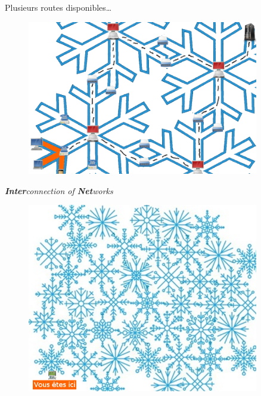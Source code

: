 \begin{frame}{Plusieurs routes disponibles…}
  \begin{figure}
    \includegraphics[width=0.9\textwidth]{concepts/flocon-trajet.png}
  \end{figure}
\end{frame}

\begin{frame}{\textit{\textbf{Inter}connection of \textbf{Net}works}}
  \begin{figure}
    \vspace{-0.9em}
    \includegraphics[width=0.9\textwidth]{concepts/flocon-total.png}
  \end{figure}
\end{frame}

